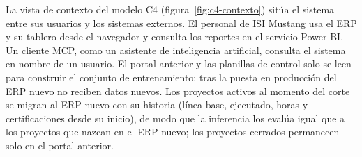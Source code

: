 \begin{figure}[H]
{
}
\end{figure}

La vista de contexto del modelo C4 (figura~\ref{fig:c4-contexto}) sitúa el sistema entre sus usuarios y los sistemas externos. El personal de ISI Mustang usa el ERP y su tablero desde el navegador y consulta los reportes en el servicio Power BI\@. Un cliente MCP, como un asistente de inteligencia artificial, consulta el sistema en nombre de un usuario. El portal anterior y las planillas de control solo se leen para construir el conjunto de entrenamiento: tras la puesta en producción del ERP nuevo no reciben datos nuevos. Los proyectos activos al momento del corte se migran al ERP nuevo con su historia (línea base, ejecutado, horas y certificaciones desde su inicio), de modo que la inferencia los evalúa igual que a los proyectos que nazcan en el ERP nuevo; los proyectos cerrados permanecen solo en el portal anterior.

